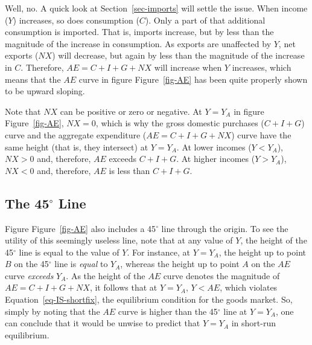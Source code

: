 \documentclass[
  letterpaper,
]{book}
\theoremstyle{plain}
\theoremstyle{remark}
\begin{document}
Well, no. A quick look at Section~\ref{sec-imports} will settle the
issue. When income (\(Y\)) increases, so does consumption (\(C\)). Only
a part of that additional consumption is imported. That is, imports
increase, but by less than the magnitude of the increase in consumption.
As exports are unaffected by \(Y\), net exports (\(NX\)) will decrease,
but again by less than the magnitude of the increase in \(C\).
Therefore, \(AE=C+I+G+NX\) will increase when \(Y\) increases, which
means that the \(AE\) curve in figure Figure~\ref{fig-AE} has been quite
properly shown to be upward sloping.

Note that \(NX\) can be positive or zero or negative. At \(Y=Y_A\) in
figure Figure~\ref{fig-AE}, \(NX=0\), which is why the gross domestic
purchases (\(C+I+G\)) curve and the aggregate expenditure
(\(AE=C+I+G+NX\)) curve have the same height (that is, they intersect)
at \(Y=Y_A\). At lower incomes (\(Y<Y_A\)), \(NX>0\) and, therefore,
\(AE\) exceeds \(C+I+G\). At higher incomes (\(Y>Y_A\)), \(NX<0\) and,
therefore, \(AE\) is less than \(C+I+G\).

\subsection{\texorpdfstring{The 45\texorpdfstring{$^{\circ}$}{-Degree}
Line}{The 45 Line}}\label{sec-45degline}

Figure Figure~\ref{fig-AE} also includes a 45\(^{\circ}\) line through
the origin. To see the utility of this seemingly useless line, note that
at any value of \(Y\), the height of the 45\(^{\circ}\) line is equal to
the value of \(Y\). For instance, at \(Y=Y_A\), the height up to point
\(B\) on the 45\(^{\circ}\) line is \emph{equal} to \(Y_A\), whereas the
height up to point \(A\) on the \(AE\) curve \emph{exceeds} \(Y_A\). As
the height of the \(AE\) curve denotes the magnitude of \(AE=C+I+G+NX\),
it follows that at \(Y=Y_A\), \(Y<AE\), which violates
Equation~\ref{eq-IS-shortfix}, the equilibrium condition for the goods
market. So, simply by noting that the \(AE\) curve is higher than the
45\(^{\circ}\) line at \(Y=Y_A\), one can conclude that it would be
unwise to predict that \(Y=Y_A\) in short-run equilibrium.
\end{document}
